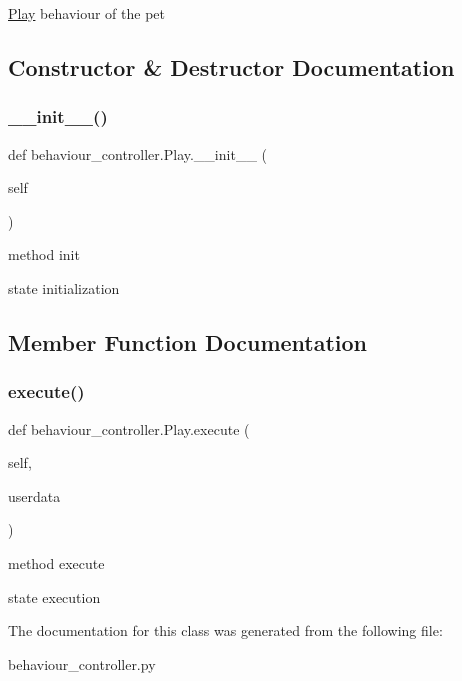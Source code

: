 \hyperlink{classbehaviour__controller_1_1Play}{Play} behaviour of the pet 

\subsection{Constructor \& Destructor Documentation}
\mbox{\label{classbehaviour__controller_1_1Play_a90fdc5f3993b7d5f4a65effec6a38965}} 
\subsubsection{\texorpdfstring{\+\_\+\+\_\+init\+\_\+\+\_\+()}{\_\_init\_\_()}}
{\footnotesize\ttfamily def behaviour\+\_\+controller.\+Play.\+\_\+\+\_\+init\+\_\+\+\_\+ (\begin{DoxyParamCaption}\item[{}]{self }\end{DoxyParamCaption})}



method init 

state initialization 

\subsection{Member Function Documentation}
\mbox{\label{classbehaviour__controller_1_1Play_af9a8184754ae235cf9a065392c0a8227}} 
\subsubsection{\texorpdfstring{execute()}{execute()}}
{\footnotesize\ttfamily def behaviour\+\_\+controller.\+Play.\+execute (\begin{DoxyParamCaption}\item[{}]{self,  }\item[{}]{userdata }\end{DoxyParamCaption})}



method execute 

state execution 

The documentation for this class was generated from the following file\+:\begin{DoxyCompactItemize}
\item 
behaviour\+\_\+controller.\+py\end{DoxyCompactItemize}
